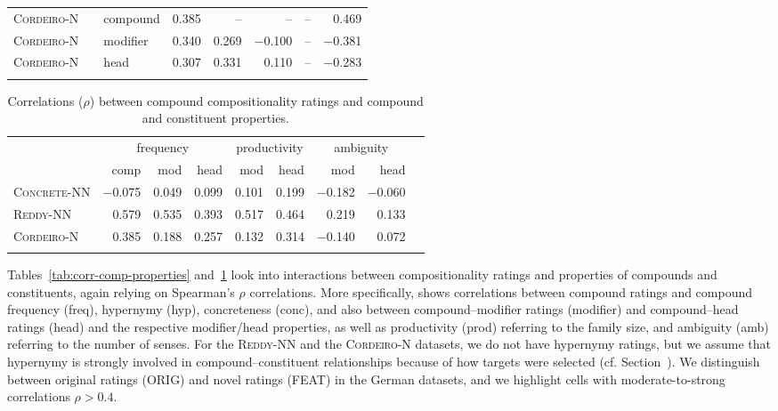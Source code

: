\documentclass[output=paper,colorlinks,citecolor=brown]{langscibook}
\begin{document}
\begin{table}[p]
\begin{tabular}{lllrrrrr}
    {\textsc{Cordeiro-N}} & & compound & 0.385 & -- & -- & -- & \cellcolor{lred} 0.469 \\
    {\textsc{Cordeiro-N}} & & modifier & 0.340 & 0.269 & −0.100 & -- & −0.381 \\
    {\textsc{Cordeiro-N}} & & head & 0.307 & 0.331 & 0.110 & -- & −0.283 \\ 

  \lspbottomrule
 \end{tabular}
\end{table}

\begin{table}[p]
\small
\caption{Correlations ($\rho$) between compound compositionality ratings and compound and constituent properties.}
\label{tab:corr-compound-properties}
 \begin{tabular}{l rrr rr rrr}
  \lsptoprule
    & \multicolumn{3}{c}{frequency} & \multicolumn{2}{c}{productivity} & \multicolumn{2}{c}{ambiguity} \\\cmidrule(lr){2-4}\cmidrule(lr){5-6}\cmidrule(lr){7-8}
    & comp & mod & head & mod & head & mod & head \\
    \midrule
    \textsc{Concrete-NN} & −0.075 & 0.049 & 0.099 & 0.101 & 0.199 & −0.182 & −0.060 \\
    \textsc{Reddy-NN} & \cellcolor{lred} 0.579 & \cellcolor{lred} 0.535 & 0.393 & \cellcolor{lred} 0.517 & \cellcolor{lred} 0.464 & 0.219 & 0.133 \\
    \textsc{Cordeiro-N} & 0.385 & 0.188 & 0.257 & 0.132  & 0.314 & −0.140 & 0.072 \\
  \lspbottomrule
 \end{tabular}
\end{table}

Tables~\ref{tab:corr-comp-properties} and~\ref{tab:corr-compound-properties} look into interactions between compositionality ratings and properties of compounds and constituents, again relying on Spearman's $\rho$ correlations. More specifically,  shows correlations between compound ratings and compound frequency (freq), hypernymy (hyp), concreteness (conc), and also between compound--modifier ratings (modifier) and compound--head ratings (head) and the respective modifier/head properties, as well as productivity (prod) referring to the family size, and ambiguity (amb) referring to the number of senses. For the \textsc{Reddy-NN} and the \textsc{Cordeiro-N} datasets, we do not have hypernymy ratings, but we assume that hypernymy is strongly involved in compound--constituent relationships because of how targets were selected (cf. Section~). We distinguish between original ratings (ORIG) and novel ratings (FEAT) in the German datasets, and we highlight cells with moderate-to-strong correlations $\rho > 0.4$. 
\end{document}
